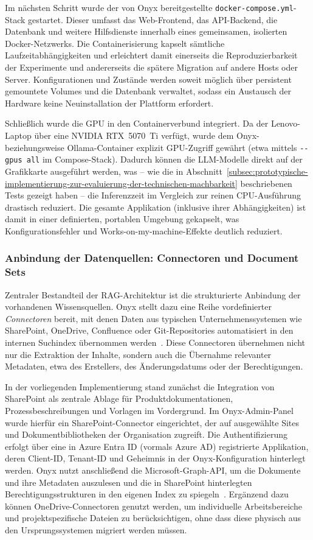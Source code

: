 Im nächsten Schritt wurde der von Onyx bereitgestellte \texttt{docker-compose.yml}-Stack gestartet.
Dieser umfasst das Web-Frontend, das API-Backend, die Datenbank und weitere Hilfsdienste innerhalb eines gemeinsamen, isolierten Docker-Netzwerks.
Die Containerisierung kapselt sämtliche Laufzeitabhängigkeiten und erleichtert damit einerseits die Reproduzierbarkeit der Experimente und andererseits die spätere Migration auf andere Hosts oder Server.
Konfigurationen und Zustände werden soweit möglich über persistent gemountete Volumes und die Datenbank verwaltet, sodass ein Austausch der Hardware keine Neuinstallation der Plattform erfordert.

Schließlich wurde die GPU in den Containerverbund integriert.
Da der Lenovo-Laptop über eine NVIDIA RTX~5070~Ti verfügt, wurde dem Onyx- beziehungsweise Ollama-Container explizit GPU-Zugriff gewährt (etwa mittels \verb|--gpus all| im Compose-Stack).
Dadurch können die LLM-Modelle direkt auf der Grafikkarte ausgeführt werden, was – wie die in Abschnitt~\ref{subsec:prototypische-implementierung-zur-evaluierung-der-technischen-machbarkeit} beschriebenen Tests gezeigt haben – die Inferenzzeit im Vergleich zur reinen CPU-Ausführung drastisch reduziert.
Die gesamte Applikation (inklusive ihrer Abhängigkeiten) ist damit in einer definierten, portablen Umgebung gekapselt, was Konfigurationsfehler und \glqq Works-on-my-machine\grqq-Effekte deutlich reduziert.

\subsubsection{Anbindung der Datenquellen: Connectoren und Document Sets}

Zentraler Bestandteil der RAG-Architektur ist die strukturierte Anbindung der vorhandenen Wissensquellen.
Onyx stellt dazu eine Reihe vordefinierter \textit{Connectoren} bereit, mit denen Daten aus typischen Unternehmenssystemen wie SharePoint, OneDrive, Confluence oder Git-Repositories automatisiert in den internen Suchindex übernommen werden~\cite{onyx_github,onyx_docs}.
Diese Connectoren übernehmen nicht nur die Extraktion der Inhalte, sondern auch die Übernahme relevanter Metadaten, etwa des Erstellers, des Änderungsdatums oder der Berechtigungen.

In der vorliegenden Implementierung stand zunächst die Integration von SharePoint als zentrale Ablage für Produktdokumentationen, Prozessbeschreibungen und Vorlagen im Vordergrund.
Im Onyx-Admin-Panel wurde hierfür ein SharePoint-Connector eingerichtet, der auf ausgewählte Sites und Dokumentbibliotheken der Organisation zugreift.
Die Authentifizierung erfolgt über eine in Azure Entra ID (vormals Azure AD) registrierte Applikation, deren Client-ID, Tenant-ID und Geheimnis in der Onyx-Konfiguration hinterlegt werden.
Onyx nutzt anschließend die Microsoft-Graph-API, um die Dokumente und ihre Metadaten auszulesen und die in SharePoint hinterlegten Berechtigungsstrukturen in den eigenen Index zu spiegeln~\cite{onyx_docs}.
Ergänzend dazu können OneDrive-Connectoren genutzt werden, um individuelle Arbeitsbereiche und projektspezifische Dateien zu berücksichtigen, ohne dass diese physisch aus den Ursprungssystemen migriert werden müssen.

